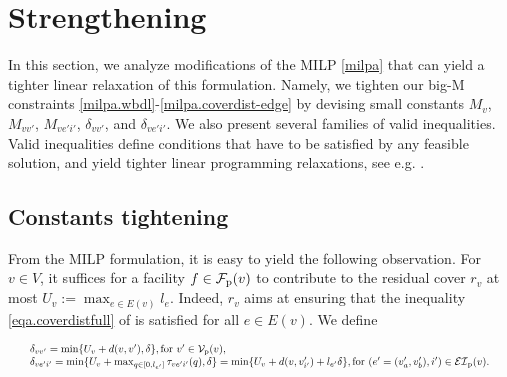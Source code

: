 \begin{table}[]
	\centering
	\caption{Comparative summary on MILP formulations for the CSCP}
 
	\label{tab:milps}
\end{table}

\section{Strengthening}\label{sec:strenght}
In this section, we analyze modifications of the MILP \eqref{milpa} that can yield a tighter linear relaxation of this formulation. Namely, we tighten our big-M constraints \eqref{milpa.wbdl}-\eqref{milpa.coverdist-edge} by devising small constants $M_v$, $M_{vv'}$, $M_{ve'i'}$, $\delta_{vv'}$, and $\delta_{ve'i'}$. We also present several families of valid inequalities. Valid inequalities define conditions that have to be satisfied by any feasible solution, and yield tighter linear programming relaxations, see e.g. \cite{wolsey}.

\subsection{Constants tightening}
\label{sec:strenght.bd}
From the MILP formulation, it is easy to yield the following observation. For $v \in V$, it suffices for a facility $f \in \mathcal F_{\mathrm{p}}(v)$ to contribute to the residual cover $r_v$ at most $U_v := \max_{e \in {E}(v)} l_e$. Indeed, $r_v$ aims at ensuring that the inequality \eqref{eqa.coverdistfull} of  is satisfied for all $e\in E(v)$. We define


\begin{equation*}
\resizebox{0.99\hsize}{!}{
$
\begin{array}{l}
  	\delta_{vv'}= \min\{U_v + d(v,v'), \delta\},  \textup{for } v' \in \cV_{\mathrm{p}}(v), \\
   	\delta_{ve'i'}= \min\{U_v + \max_{q \in [0, l_{e'}]} \tau_{ve'i'}(q) , \delta\}
	=  \min\{U_v+ d(v,v'_{i'})+l_{e'} \delta \}, \textup{for } (e'=(v'_a,v'_b),i') \in \cEI_{\mathrm{p}}(v).
\end{array}
$
}
\end{equation*}


